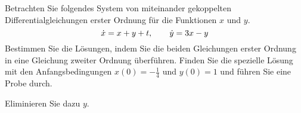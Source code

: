 \begin{atiTask}[
  title = Gekoppelte Differentialgleichungen
]
  Betrachten Sie folgendes System von miteinander gekoppelten Differentialgleichungen erster Ordnung für die Funktionen $x$ und $y$.
  \[
    \dot{x} = x+ y + t,\qquad \dot{y} = 3x - y
  \]
  Bestimmen Sie die Lösungen, indem Sie die beiden Gleichungen erster Ordnung in eine Gleichung zweiter Ordnung überführen.
  Finden Sie die spezielle Lösung mit den Anfangsbedingungen $x(0)=-\frac{1}{4}$ und $y(0)=1$ und führen Sie eine Probe durch.

  \begin{atiNote}
    Eliminieren Sie dazu $y$.
  \end{atiNote}
\end{atiTask}